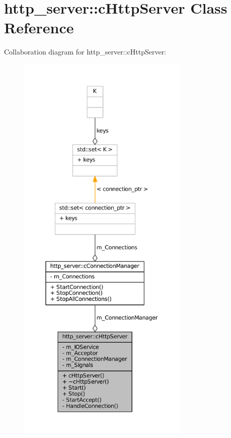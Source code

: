 \hypertarget{classhttp__server_1_1cHttpServer}{\section{http\-\_\-server\-:\-:c\-Http\-Server \-Class \-Reference}
\label{classhttp__server_1_1cHttpServer}
}


\-Collaboration diagram for http\-\_\-server\-:\-:c\-Http\-Server\-:\nopagebreak
\begin{figure}[H]
\begin{center}
\leavevmode
\includegraphics[height=550pt]{classhttp__server_1_1cHttpServer__coll__graph}
\end{center}
\end{figure}
